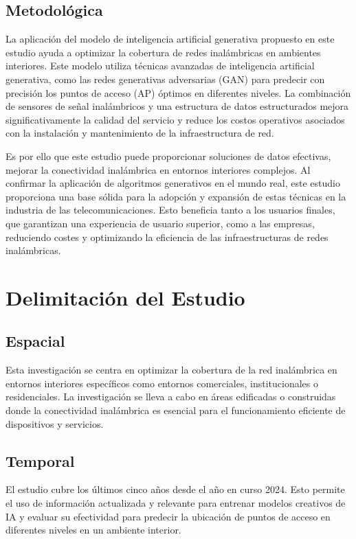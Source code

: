 \subsection{Metodológica}
La aplicación del modelo de inteligencia artificial generativa propuesto en este estudio ayuda a optimizar la cobertura de redes inalámbricas en ambientes interiores. Este modelo utiliza técnicas avanzadas de inteligencia artificial generativa, como las redes generativas adversarias (GAN) para predecir con precisión los puntos de acceso (AP) óptimos en diferentes niveles. La combinación de sensores de señal inalámbricos y una estructura de datos estructurados mejora significativamente la calidad del servicio y reduce los costos operativos asociados con la instalación y mantenimiento de la infraestructura de red.

Es por ello que este estudio puede proporcionar soluciones de datos efectivas, mejorar la conectividad inalámbrica en entornos interiores complejos. Al confirmar la aplicación de algoritmos generativos en el mundo real, este estudio proporciona una base sólida para la adopción y expansión de estas técnicas en la industria de las telecomunicaciones. Esto beneficia tanto a los usuarios finales, que garantizan una experiencia de usuario superior, como a las empresas, reduciendo costes y optimizando la eficiencia de las infraestructuras de redes inalámbricas.

\section{Delimitación del Estudio}

\subsection{Espacial}
Esta investigación se centra en optimizar la cobertura de la red inalámbrica en entornos interiores específicos como entornos comerciales, institucionales o residenciales. La investigación se lleva a cabo en áreas edificadas o construidas donde la conectividad inalámbrica es esencial para el funcionamiento eficiente de dispositivos y servicios. 

\subsection{Temporal}
El estudio cubre los últimos cinco años desde el año en curso 2024. Esto permite el uso de información actualizada y relevante para entrenar modelos creativos de IA y evaluar su efectividad para predecir la ubicación de puntos de acceso en diferentes niveles en un ambiente interior.


